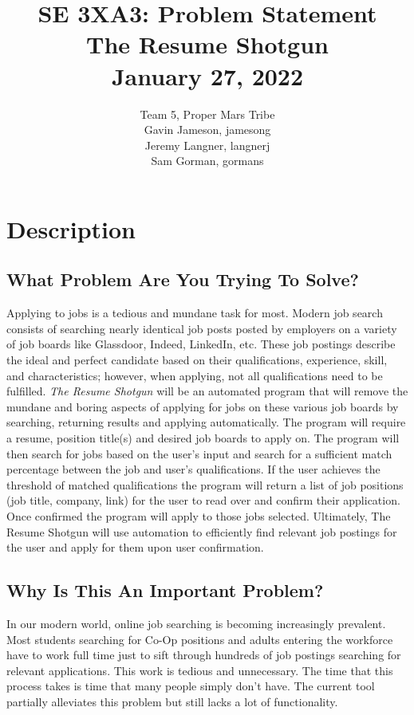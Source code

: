 \documentclass{article}
\title{SE 3XA3: Problem Statement\\The Resume Shotgun\\January 27, 2022}
\author{Team 5, Proper Mars Tribe
		\\ Gavin Jameson, jamesong
		\\ Jeremy Langner, langnerj
		\\ Sam Gorman, gormans
}
\date{}
\begin{document}
\maketitle

\newpage

\tableofcontents

\newpage

\section{Description}

\subsection{What Problem Are You Trying To Solve?}
Applying to jobs is a tedious and mundane task for most. Modern job search consists of searching nearly identical job posts posted by employers on a variety of job boards like Glassdoor, Indeed, LinkedIn, etc. These job postings describe the ideal and perfect candidate based on their qualifications, experience, skill, and characteristics; however, when applying, not all qualifications need to be fulfilled. \textit{The Resume Shotgun} will be an automated program that will remove the mundane and boring aspects of applying for jobs on these various job boards by searching, returning results and applying automatically. The program will require a resume, position title(s) and desired job boards to apply on. The program will then search for jobs based on the user's input and search for a sufficient match percentage between the job and user's qualifications. If the user achieves the threshold of matched qualifications the program will return a list of job positions (job title, company, link) for the user to read over and confirm their application. Once confirmed the program will apply to those jobs selected. Ultimately, The Resume Shotgun will use automation to efficiently find relevant job postings for the user and apply for them upon user confirmation.

\subsection{Why Is This An Important Problem?}
In our modern world, online job searching is becoming increasingly prevalent. 
Most students searching for Co-Op positions and adults entering the workforce have to work full time 
just to sift through hundreds of job postings searching for relevant applications. This work is tedious 
and unnecessary. The time that this process takes is time that many people simply don’t have.
The current tool partially alleviates this problem but still lacks a lot of functionality. 
\end{document}
